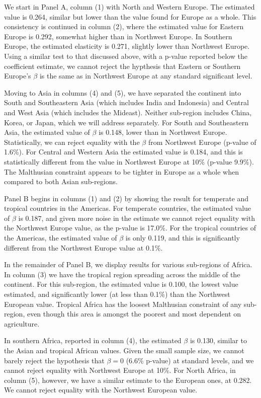 \documentclass[11pt]{article}
\begin{document}
We start in Panel A, column (1) with North and Western Europe. The estimated value is 0.264, similar but lower than the value found for Europe as a whole. This consistency is continued in column (2), where the estimated value for Eastern Europe is 0.292, somewhat higher than in Northwest Europe. In Southern Europe, the estimated elasticity is 0.271, slightly lower than Northwest Europe. Using a similar test to that discussed above, with a p-value reported below the coefficient estimate, we cannot reject the hypthesis that Eastern or Southern Europe's $\beta$ is the same as in Northwest Europe at any standard significant level.

Moving to Asia in columns (4) and (5), we have separated the continent into South and Southeastern Asia (which includes India and Indonesia) and Central and West Asia (which includes the Mideast). Neither sub-region includes China, Korea, or Japan, which we will address separately. For South and Southeastern Asia, the estimated value of $\beta$ is 0.148, lower than in Northwest Europe. Statistically, we can reject equality with the $\beta$ from Northwest Europe (p-value of 1.6\%). For Central and Western Asia the estimated value is 0.184, and this is statistically different from the value in Northwest Europe at 10\% (p-value 9.9\%). The Malthusian constraint appears to be tighter in Europe as a whole when compared to both Asian sub-regions.

Panel B begins in columns (1) and (2) by showing the result for temperate and tropical countries in the Americas. For temperate countries, the estimated value of $\beta$ is 0.187, and given more noise in the estimate we cannot reject equality with the Northwest Europe value, as the p-value is 17.0\%. For the tropical countries of the Americas, the estimated value of $\beta$ is only 0.119, and this is significantly different from the Northwest Europe value at 0.1\%.

In the remainder of Panel B, we display results for various sub-regions of Africa. In column (3) we have the tropical region spreading across the middle of the continent. For this sub-region, the estimated value is 0.100, the lowest value estimated, and significantly lower (at less than 0.1\%) than the Northwest European value. Tropical Africa has the loosest Malthusian constraint of any sub-region, even though this area is amongst the poorest and most dependent on agriculture.

In southern Africa, reported in column (4), the estimated $\beta$ is 0.130, similar to the Asian and tropical African values. Given the small sample size, we cannot barely reject the hypothesis that $\beta=0$ (6.6\% p-value) at standard levels, and we cannot reject equality with Northwest Europe at 10\%. For North Africa, in column (5), however, we have a similar estimate to the European ones, at 0.282. We cannot reject equality with the Northwest European value.
\end{document}
